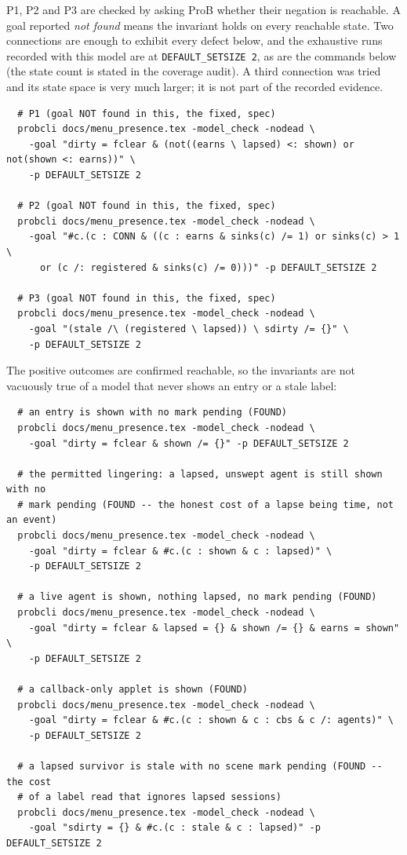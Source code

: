 \documentclass[a4paper,10pt,fleqn]{article}
\begin{document}
P1, P2 and P3 are checked by asking ProB whether their negation is reachable. A
goal reported \emph{not found} means the invariant holds on every reachable
state. Two connections are enough to exhibit every defect below, and the
exhaustive runs recorded with this model are at \texttt{DEFAULT\_SETSIZE 2},
as are the commands below (the state count is stated in the coverage audit). A
third connection was tried and its state space is very much larger; it is not
part of the recorded evidence.

\begin{verbatim}
  # P1 (goal NOT found in this, the fixed, spec)
  probcli docs/menu_presence.tex -model_check -nodead \
    -goal "dirty = fclear & (not((earns \ lapsed) <: shown) or not(shown <: earns))" \
    -p DEFAULT_SETSIZE 2

  # P2 (goal NOT found in this, the fixed, spec)
  probcli docs/menu_presence.tex -model_check -nodead \
    -goal "#c.(c : CONN & ((c : earns & sinks(c) /= 1) or sinks(c) > 1 \
      or (c /: registered & sinks(c) /= 0)))" -p DEFAULT_SETSIZE 2

  # P3 (goal NOT found in this, the fixed, spec)
  probcli docs/menu_presence.tex -model_check -nodead \
    -goal "(stale /\ (registered \ lapsed)) \ sdirty /= {}" \
    -p DEFAULT_SETSIZE 2
\end{verbatim}

The positive outcomes are confirmed reachable, so the invariants are not
vacuously true of a model that never shows an entry or a stale label:

\begin{verbatim}
  # an entry is shown with no mark pending (FOUND)
  probcli docs/menu_presence.tex -model_check -nodead \
    -goal "dirty = fclear & shown /= {}" -p DEFAULT_SETSIZE 2

  # the permitted lingering: a lapsed, unswept agent is still shown with no
  # mark pending (FOUND -- the honest cost of a lapse being time, not an event)
  probcli docs/menu_presence.tex -model_check -nodead \
    -goal "dirty = fclear & #c.(c : shown & c : lapsed)" \
    -p DEFAULT_SETSIZE 2

  # a live agent is shown, nothing lapsed, no mark pending (FOUND)
  probcli docs/menu_presence.tex -model_check -nodead \
    -goal "dirty = fclear & lapsed = {} & shown /= {} & earns = shown" \
    -p DEFAULT_SETSIZE 2

  # a callback-only applet is shown (FOUND)
  probcli docs/menu_presence.tex -model_check -nodead \
    -goal "dirty = fclear & #c.(c : shown & c : cbs & c /: agents)" \
    -p DEFAULT_SETSIZE 2

  # a lapsed survivor is stale with no scene mark pending (FOUND -- the cost
  # of a label read that ignores lapsed sessions)
  probcli docs/menu_presence.tex -model_check -nodead \
    -goal "sdirty = {} & #c.(c : stale & c : lapsed)" -p DEFAULT_SETSIZE 2
\end{verbatim}
\end{document}
